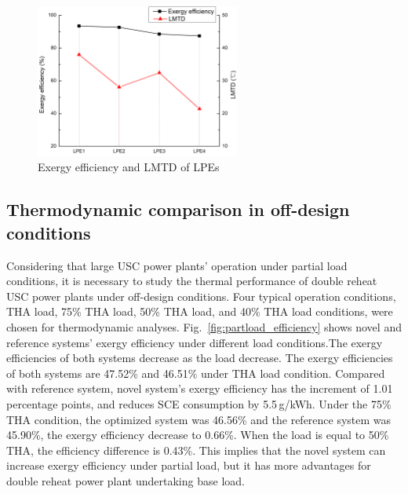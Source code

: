 \documentclass[preprint,12pt]{elsarticle}
\begin{document}
\begin{figure}[htbp]
\centering
\includegraphics[width=0.6\textwidth]{fig/LPE_exergy_LMTD.png}
\caption{Exergy efficiency and LMTD of LPEs} 
\label{fig:LPE_exergy_LMDT}
\end{figure}


\subsection{Thermodynamic comparison in off-design conditions}
\label{ssub:offdesing_compare}
Considering that large USC power plants' operation under partial load conditions, it is necessary to study the thermal performance of double reheat USC power plants under off-design conditions.
Four typical operation conditions, THA load, 75\% THA load, 50\% THA load, and 40\% THA load conditions, were chosen for thermodynamic analyses. 
Fig.~\ref{fig:partload_efficiency} shows novel and reference systems' exergy efficiency under different load conditions.The exergy efficiencies of both systems decrease as the load decrease.
The exergy efficiencies of both systems are 47.52\% and 46.51\% under THA load condition. Compared with reference system, novel system's exergy efficiency has the increment of 1.01 percentage points, and reduces SCE consumption by 5.5\,g/kWh.
Under the 75\% THA condition, the optimized system was 46.56\% and the reference system was 45.90\%, the exergy
efficiency decrease to 0.66\%. 
When the load is equal to 50\% THA, the efficiency difference is 0.43\%.
This implies that the novel system can increase exergy efficiency under partial load, but it has more advantages for double reheat power plant undertaking base load.
\end{document}
